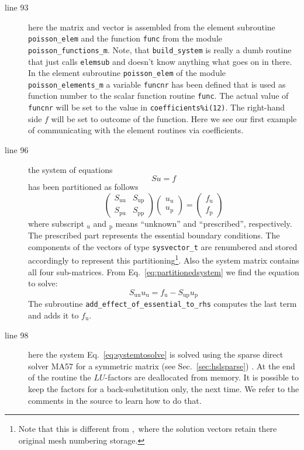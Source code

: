 \begin{description}
   \item[line 93] here the matrix and vector is assembled from
 the element
 subroutine \texttt{poisson\_elem} and the function \texttt{func} from the
module \texttt{poisson\_functions\_m}. 
Note, that
\texttt{build\_system} is really a dumb routine that just calls \texttt{elemsub}
and doesn't know anything what goes on in there. 
   In the element subroutine \texttt{poisson\_elem} of the
     module \texttt{poisson\_elements\_m} a 
     variable \texttt{funcnr} has been defined that is used as function number
     to the scalar function routine \texttt{func}. The actual value of
     \texttt{funcnr} will be set to the value in \texttt{coefficients\%i(12)}.
     The right-hand side $f$ will be set to outcome of the function.
     Here we see our first
     example of communicating with the element routines via coefficients.
   \item[line 96] the system of equations
\begin{equation}
   Su=f
\end{equation}
has been partitioned as follows
\begin{equation}
   \begin{pmatrix}
      S_{\text{uu}} & S_{\text{up}} \\
      S_{\text{pu}} & S_{\text{pp}} 
   \end{pmatrix} 
   \begin{pmatrix}
      u_\text{u} \\
      u_\text{p}
   \end{pmatrix}=
   \begin{pmatrix}
      f_\text{u} \\
      f_\text{p}
   \end{pmatrix}
   \label{eq:partitionedsystem}
\end{equation}
where subscript $_\text{u}$ and $_\text{p}$ means ``unknown'' and ``prescribed'',
respectively. The prescribed part represents the essential boundary conditions.
The components of the vectors of type \texttt{sysvector\_t} are renumbered and
stored accordingly to
represent this partitioning\footnote{Note that this is different from \sep\,
where the solution vectors retain there original mesh numbering storage.}. Also
the system matrix contains all four sub-matrices. From
Eq.~\eqref{eq:partitionedsystem} we find the equation to solve:
\begin{equation}
   S_{\text{uu}}u_\text{u}=f_{\text{u}}-S_{\text{up}}u_\text{p}
  \label{eq:systemtosolve}
\end{equation}
The subroutine \texttt{add\_effect\_of\_essential\_to\_rhs} computes the last
term and adds it to $f_{\text{u}}$.

\item[line 98] here the system Eq.~\eqref{eq:systemtosolve} is solved using the
sparse direct solver MA57 for a symmetric matrix 
 (see Sec.~\ref{sec:hslsparse}) \cite{HSL}. At the end of the routine the
$LU$-factors are deallocated from memory. It is possible to keep the factors
for a back-substitution only, the next time. We refer to the comments in the
source to learn how to do that. 
\end{description}

